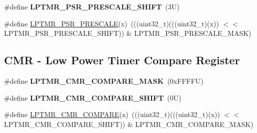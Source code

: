 \begin{DoxyCompactItemize}
\item 
\mbox{\label{group___l_p_t_m_r___register___masks_ga7ed76902e13634d0c543ade3ef47525a}} 
\#define {\bfseries L\+P\+T\+M\+R\+\_\+\+P\+S\+R\+\_\+\+P\+R\+E\+S\+C\+A\+L\+E\+\_\+\+S\+H\+I\+FT}~(3\+U)
\item 
\#define \mbox{\hyperlink{group___l_p_t_m_r___register___masks_ga37d8f4b0de3a75590548d8f3b6686b95}{L\+P\+T\+M\+R\+\_\+\+P\+S\+R\+\_\+\+P\+R\+E\+S\+C\+A\+LE}}(x)~(((uint32\+\_\+t)(((uint32\+\_\+t)(x)) $<$$<$ L\+P\+T\+M\+R\+\_\+\+P\+S\+R\+\_\+\+P\+R\+E\+S\+C\+A\+L\+E\+\_\+\+S\+H\+I\+FT)) \& L\+P\+T\+M\+R\+\_\+\+P\+S\+R\+\_\+\+P\+R\+E\+S\+C\+A\+L\+E\+\_\+\+M\+A\+SK)
\end{DoxyCompactItemize}
\subsection*{C\+MR -\/ Low Power Timer Compare Register}
\begin{DoxyCompactItemize}
\item 
\mbox{\label{group___l_p_t_m_r___register___masks_ga55cc95c022500b353f1724f2cbfe7a8f}} 
\#define {\bfseries L\+P\+T\+M\+R\+\_\+\+C\+M\+R\+\_\+\+C\+O\+M\+P\+A\+R\+E\+\_\+\+M\+A\+SK}~(0x\+F\+F\+F\+F\+U)
\item 
\mbox{\label{group___l_p_t_m_r___register___masks_gae1a525e22dc8b9c6960ae2e859a64232}} 
\#define {\bfseries L\+P\+T\+M\+R\+\_\+\+C\+M\+R\+\_\+\+C\+O\+M\+P\+A\+R\+E\+\_\+\+S\+H\+I\+FT}~(0\+U)
\item 
\#define \mbox{\hyperlink{group___l_p_t_m_r___register___masks_gad61ee0ea43ca3e503c2c16ed1b7b1696}{L\+P\+T\+M\+R\+\_\+\+C\+M\+R\+\_\+\+C\+O\+M\+P\+A\+RE}}(x)~(((uint32\+\_\+t)(((uint32\+\_\+t)(x)) $<$$<$ L\+P\+T\+M\+R\+\_\+\+C\+M\+R\+\_\+\+C\+O\+M\+P\+A\+R\+E\+\_\+\+S\+H\+I\+FT)) \& L\+P\+T\+M\+R\+\_\+\+C\+M\+R\+\_\+\+C\+O\+M\+P\+A\+R\+E\+\_\+\+M\+A\+SK)
\end{DoxyCompactItemize}
